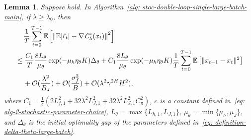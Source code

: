 \documentclass{article}
\theoremstyle{plain}
\newtheorem{lemma}{Lemma}
\theoremstyle{definition}
\theoremstyle{remark}
\def\E{\mathbb E}
\def\cL{\mathcal L}
\def\cO{\mathcal O}
\begin{document}
\begin{lemma}
    \label{lemma: bound-of-error-of-stochastic-inner-large-batch}
    Suppose  hold.
    In Algorithm~\ref{alg: stoc-double-loop-single-large-batch-main}, if $\lambda \geq \lambda_0$, then
    \begin{align}
        & \quad \, \frac{1}{T }\sum_{t=0}^{T-1} \E \left[ \left\| \E [\ell_t ] - \nabla \cL_\lambda^*(x_t) \right\|^2 \right] \notag \\
        & \leq \frac{C_1}{T} \frac{8L_{\theta}}{\mu_\theta} \exp ( - \mu_h \eta_\theta K )   \Delta_\theta  + C_1 \frac{8 L_{\theta}}{\mu_\theta} \exp( - \mu_h \eta_\theta K ) \frac{1}{T} \sum_{t=0}^{T-1} \E \left[ \|x_{t+1} - x_{t} \|^2 \right]\notag \\
        & \quad \,+ \cO(\frac{\lambda^2}{B_J})  + \cO(\frac{\sigma_f^2}{B}) + \cO(\lambda^2\gamma^{2H}H^2 ), \notag 
    \end{align}
    where $C_1 = \frac{1}{c}\left(2L_{f,1}^2 + 32\lambda^2L_{J,1}^2 + 32 \lambda^2L_{J,1}^2C_{\pi}^2\right)$, $c$ is a constant defined in~\eqref{eq: alg-2-stochastic-parameter-choice},  $L_\theta = \max\{L_{h,1},L_{J,1}\}$, $\mu_\theta = \min\{\mu_h,\mu_J\}$, and $ \Delta_\theta $ is the initial optimality gap of the parameters defined in~\eqref{eq: definition-delta-theta-large-batch}.
\end{lemma}
\end{document}

